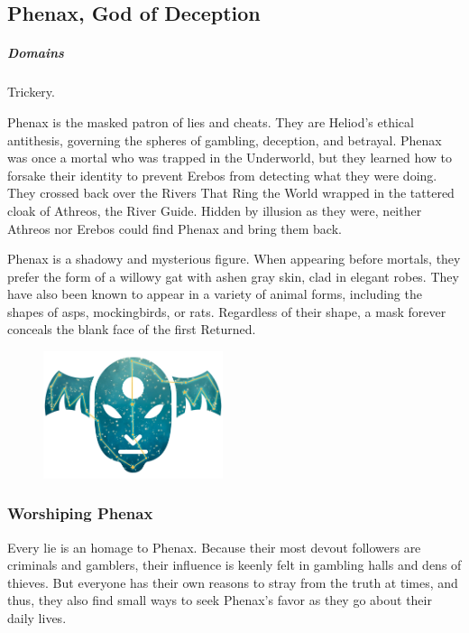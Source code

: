 \subsection*{Phenax, God of Deception} \label{ssec::phenax}
    \subparagraph{Domains} Trickery.

    Phenax is the masked patron of lies and cheats.
    They are Heliod's ethical antithesis, governing the spheres of gambling, deception, and betrayal.
    Phenax was once a mortal who was trapped in the Underworld, but they learned how to forsake their identity to prevent Erebos from detecting what they were doing.
    They crossed back over the Rivers That Ring the World wrapped in the tattered cloak of Athreos, the River Guide.
    Hidden by illusion as they were, neither Athreos nor Erebos could find Phenax and bring them back.


    Phenax is a shadowy and mysterious figure.
    When appearing before mortals, they prefer the form of a willowy gat with ashen gray skin, clad in elegant robes.
    They have also been known to appear in a variety of animal forms, including the shapes of asps, mockingbirds, or rats.
    Regardless of their shape, a mask forever conceals the blank face of the first Returned.

    \begin{figure}[t]
        \centering
        \includegraphics[width=0.47\textwidth]{02viphoger/img/10s_phenax.png}
    \end{figure}

    \subsubsection{Worshiping Phenax}
        Every lie is an homage to Phenax.
        Because their most devout followers are criminals and gamblers, their influence is keenly felt in gambling halls and dens of thieves.
        But everyone has their own reasons to stray from the truth at times, and thus, they also find small ways to seek Phenax's favor as they go about their daily lives.

